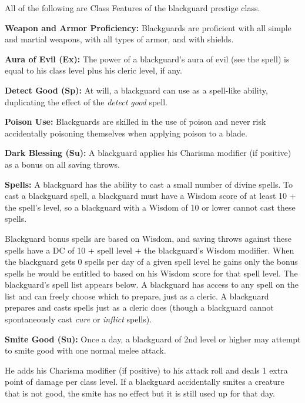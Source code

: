 \ClassFeatures

All of the following are Class Features of the blackguard prestige class.

\textbf{Weapon and Armor Proficiency:} Blackguards are proficient with all simple 
and martial weapons, with all types of armor, and with shields.

\textbf{Aura of Evil (Ex):} The power of a blackguard's aura of evil (see the  spell) is equal to his class level plus his cleric level, if any.

\textbf{Detect Good (Sp):} At will, a blackguard can use  as a spell-like ability, duplicating the effect of the \textit{detect good} spell.

\textbf{Poison Use:} Blackguards are skilled in the use of poison and never risk 
accidentally poisoning themselves when applying poison to a blade.

\textbf{Dark Blessing (Su):} A blackguard applies his Charisma modifier (if positive) 
as a bonus on all saving throws.

\textbf{Spells:} A blackguard has the ability to cast a small number of divine 
spells. To cast a blackguard spell, a blackguard must have a Wisdom score of at 
least 10 + the spell's level, so a blackguard with a Wisdom of 10 or lower cannot 
cast these spells.

Blackguard bonus spells are based on Wisdom, and saving throws against these spells 
have a DC of 10 + spell level + the blackguard's Wisdom modifier. When the blackguard 
gets 0 spells per day of a given spell level he gains only the bonus spells he 
would be entitled to based on his Wisdom score for that spell level. The blackguard's 
spell list appears below. A blackguard has access to any spell on the list and 
can freely choose which to prepare, just as a cleric. A blackguard prepares and 
casts spells just as a cleric does (though a blackguard cannot spontaneously cast 
\textit{cure} or \textit{inflict} spells).

\textbf{Smite Good (Su):} Once a day, a blackguard of 2nd level or higher may attempt 
to smite good with one normal melee attack.

He adds his Charisma modifier (if positive) to his attack roll and deals 1 extra 
point of damage per class level. If a blackguard accidentally smites a creature 
that is not good, the smite has no effect but it is still used up for that day.

